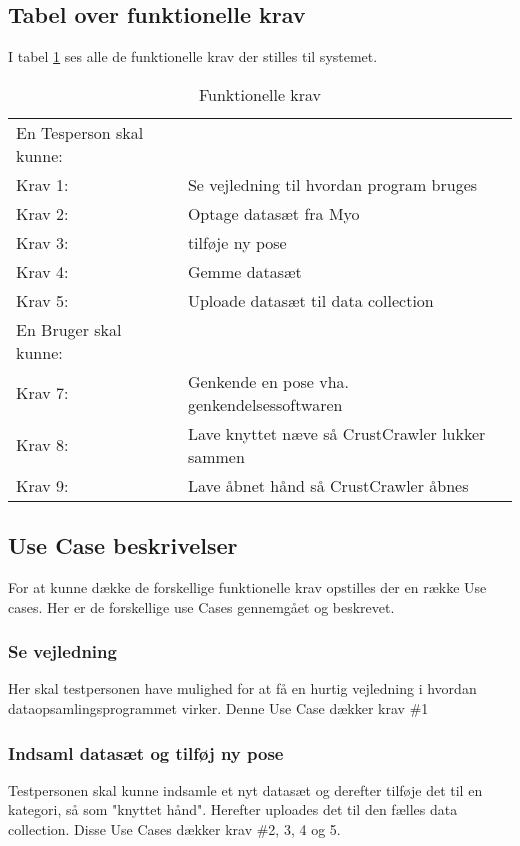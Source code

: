 \subsection*{Tabel over funktionelle krav}
I tabel \ref{tab:funktionellekrav} ses alle de funktionelle krav der stilles til systemet.
\bgroup
\def\arraystretch{1.8}
\begin{center}
	\begin{table}
		\begin{tabular}{lp{225pt}}
			\rowcolor{grey} En Tesperson skal kunne: &\\
			Krav 1:& Se vejledning til hvordan program bruges\\
			Krav 2:& Optage datasæt fra Myo\\
			Krav 3:& tilføje ny pose\\
			Krav 4:& Gemme datasæt\\
			Krav 5:& Uploade datasæt til data collection\\
			\rowcolor{grey}En Bruger skal kunne: &\\
			Krav 7:& Genkende en pose vha. genkendelsessoftwaren\\
			Krav 8:& Lave knyttet næve så CrustCrawler lukker sammen\\
			Krav 9:& Lave åbnet hånd så CrustCrawler åbnes
		\end{tabular}
		\caption{Funktionelle krav}
		\label{tab:funktionellekrav}
	\end{table}	
\end{center}
\egroup

\subsection*{Use Case beskrivelser}
For at kunne dække de forskellige funktionelle krav opstilles der en række Use cases. Her er de forskellige use Cases gennemgået og beskrevet.

\subsubsection{Se vejledning}
Her skal testpersonen have mulighed for at få en hurtig vejledning i hvordan dataopsamlingsprogrammet virker. Denne Use Case dækker krav \#1

\subsubsection{Indsaml datasæt og tilføj ny pose}
Testpersonen skal kunne indsamle et nyt datasæt og derefter tilføje det til en kategori, så som "knyttet hånd". Herefter uploades det til den fælles data collection. Disse Use Cases dækker krav \#2, 3, 4 og 5.
